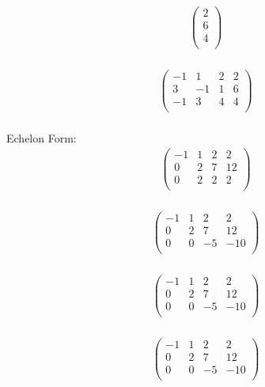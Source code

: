 \documentclass{article}
\begin{document}
\begin{align*}
\begin{pmatrix}
2\\
6\\
4\\
\end{pmatrix}
\end{align*}
\\
\begin{align*}
\left(
\begin{array}{ccc|c}
-1 & 1 & 2 & 2\\
3 & -1 & 1 & 6\\
-1 & 3 & 4 & 4\\
\end{array}
\right)
\end{align*}
\\
Echelon Form:\\
\begin{align*}
\left(
\begin{array}{ccc|c}
-1 & 1 & 2 & 2\\
0 & 2 & 7 & 12\\
0 & 2 & 2 & 2\\
\end{array}
\right)
\end{align*}
\\
\begin{align*}
\left(
\begin{array}{ccc|c}
-1 & 1 & 2 & 2\\
0 & 2 & 7 & 12\\
0 & 0 & -5 & -10\\
\end{array}
\right)
\end{align*}
\\
\begin{align*}
\left(
\begin{array}{ccc|c}
-1 & 1 & 2 & 2\\
0 & 2 & 7 & 12\\
0 & 0 & -5 & -10\\
\end{array}
\right)
\end{align*}
\\
\begin{align*}
\left(
\begin{array}{ccc|c}
-1 & 1 & 2 & 2\\
0 & 2 & 7 & 12\\
0 & 0 & -5 & -10\\
\end{array}
\right)
\end{align*}
\end{document}
